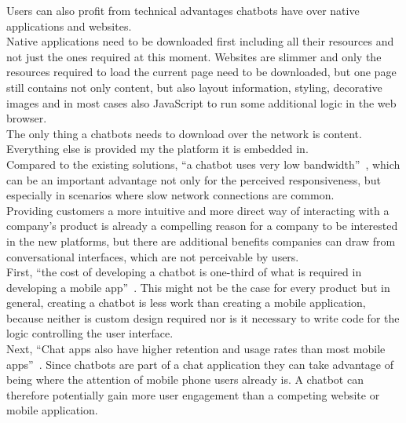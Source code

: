 Users can also profit from technical advantages chatbots have over native applications and websites.
\\
Native applications need to be downloaded first including all their resources and not just the ones required at this moment.
Websites are slimmer and only the resources required to load the current page need to be downloaded,
but one page still contains not only content, but also layout information, styling, decorative images and in most cases also JavaScript to run some additional logic in the web browser.
\\
The only thing a chatbots needs to download over the network is content.
Everything else is provided my the platform it is embedded in.
\\
Compared to the existing solutions, ``a chatbot uses very low bandwidth''~\cite{techinasia}, which can be an important advantage not only for the perceived responsiveness, but especially in scenarios where slow network connections are common.
\\

Providing customers a more intuitive and more direct way of interacting with a company's product is already a compelling reason for a company to be interested in the new platforms, but there are additional benefits companies can draw from conversational interfaces, which are not perceivable by users.
\\

First, ``the cost of developing a chatbot is one-third of what is required in developing a mobile app''~\cite{techinasia}.
This might not be the case for every product but in general, creating a chatbot is less work than creating a mobile application, because neither is custom design required nor is it necessary to write code for the logic controlling the user interface.
\\

Next, ``Chat apps also have higher retention and usage rates than most mobile apps''~\cite{businessinsider}.
Since chatbots are part of a chat application they can take advantage of being where the attention of mobile phone users already is.
A chatbot can therefore potentially gain more user engagement than a competing website or mobile application.
\\

